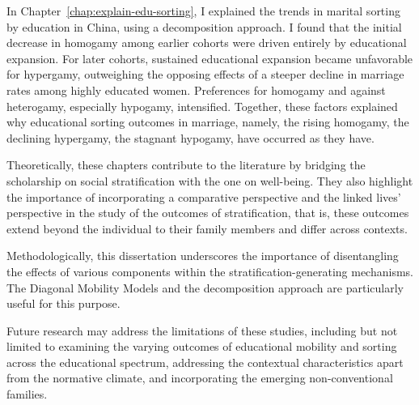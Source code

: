 In Chapter~\ref{chap:explain-edu-sorting}, I explained the trends in marital sorting by education in China, using a decomposition approach. I found that the initial decrease in homogamy among earlier cohorts were driven entirely by educational expansion. For later cohorts, sustained educational expansion became unfavorable for hypergamy, outweighing the opposing effects of a steeper decline in marriage rates among highly educated women. Preferences for homogamy and against heterogamy, especially hypogamy, intensified. Together, these factors explained why educational sorting outcomes in marriage, namely, the rising homogamy, the declining hypergamy, the stagnant hypogamy, have occurred as they have.

Theoretically, these chapters contribute to the literature by bridging the scholarship on social stratification with the one on well-being. They also highlight the importance of incorporating a comparative perspective and the linked lives' perspective in the study of the outcomes of stratification, that is, these outcomes extend beyond the individual to their family members and differ across contexts.

Methodologically, this dissertation underscores the importance of disentangling the effects of various components within the stratification-generating mechanisms. The Diagonal Mobility Models and the decomposition approach are particularly useful for this purpose.

Future research may address the limitations of these studies, including but not limited to examining the varying outcomes of educational mobility and sorting across the educational spectrum, addressing the contextual characteristics apart from the normative climate, and incorporating the emerging non-conventional families.